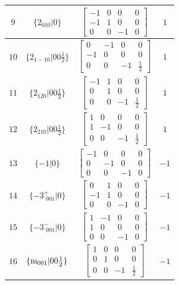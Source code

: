 \documentclass[fleqn,8pt]{jsarticle}
\begin{document}
\begin{longtable}{cccc}
$ 9 $ & $ \{2{}_{010}|0\} $ & $ \begin{bmatrix} -1 & 0 & 0 & 0 \\ -1 & 1 & 0 & 0 \\ 0 & 0 & -1 & 0 \end{bmatrix} $ & $ 1 $ \\ \hline
$ 10 $ & $ \{2{}_{1-10}|0 0 \frac{1}{2}\} $ & $ \begin{bmatrix} 0 & -1 & 0 & 0 \\ -1 & 0 & 0 & 0 \\ 0 & 0 & -1 & \frac{1}{2} \end{bmatrix} $ & $ 1 $ \\ \hline
$ 11 $ & $ \{2{}_{120}|0 0 \frac{1}{2}\} $ & $ \begin{bmatrix} -1 & 1 & 0 & 0 \\ 0 & 1 & 0 & 0 \\ 0 & 0 & -1 & \frac{1}{2} \end{bmatrix} $ & $ 1 $ \\ \hline
$ 12 $ & $ \{2{}_{210}|0 0 \frac{1}{2}\} $ & $ \begin{bmatrix} 1 & 0 & 0 & 0 \\ 1 & -1 & 0 & 0 \\ 0 & 0 & -1 & \frac{1}{2} \end{bmatrix} $ & $ 1 $ \\ \hline
$ 13 $ & $ \{-1|0\} $ & $ \begin{bmatrix} -1 & 0 & 0 & 0 \\ 0 & -1 & 0 & 0 \\ 0 & 0 & -1 & 0 \end{bmatrix} $ & $ -1 $ \\ \hline
$ 14 $ & $ \{-3^{+}_{\,\,001}|0\} $ & $ \begin{bmatrix} 0 & 1 & 0 & 0 \\ -1 & 1 & 0 & 0 \\ 0 & 0 & -1 & 0 \end{bmatrix} $ & $ -1 $ \\ \hline
$ 15 $ & $ \{-3^{-}_{\,\,001}|0\} $ & $ \begin{bmatrix} 1 & -1 & 0 & 0 \\ 1 & 0 & 0 & 0 \\ 0 & 0 & -1 & 0 \end{bmatrix} $ & $ -1 $ \\ \hline
$ 16 $ & $ \{{\rm m}_{001}|0 0 \frac{1}{2}\} $ & $ \begin{bmatrix} 1 & 0 & 0 & 0 \\ 0 & 1 & 0 & 0 \\ 0 & 0 & -1 & \frac{1}{2} \end{bmatrix} $ & $ -1 $ \\ \hline

\end{longtable}
\end{document}
